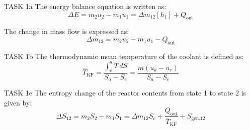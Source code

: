 TASK 1a  
The energy balance equation is written as:  
\[
\Delta E = m_2 u_2 - m_1 u_1 = \Delta m_{12} \left[ h_1 \right] + Q_{\text{out}}
\]  

The change in mass flow is expressed as:  
\[
\Delta m_{12} = m_2 u_2 - m_1 u_1 - Q_{\text{out}}
\]  

TASK 1b  
The thermodynamic mean temperature of the coolant is defined as:  
\[
\bar{T}_{\text{KF}} = \frac{\int_e^a T \, dS}{S_a - S_e} = \frac{m (u_a - u_e)}{S_a - S_e}
\]  

TASK 1e  
The entropy change of the reactor contents from state 1 to state 2 is given by:  
\[
\Delta S_{12} = m_2 S_2 - m_1 S_1 = \Delta m_{12} S_c + \frac{Q_{\text{out}}}{\bar{T}_{\text{KF}}} + S_{\text{gen,12}}
\]